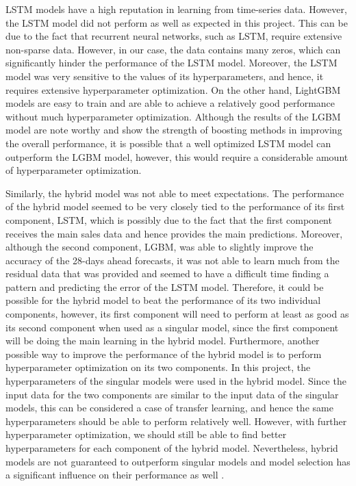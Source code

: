 LSTM models have a high reputation in learning from time-series data. 
However, the LSTM model did not perform as well as expected in this project.
This can be due to the fact that recurrent neural networks, such as LSTM, require extensive non-sparse data.
However, in our case, the data contains many zeros, which can significantly hinder the performance of the LSTM model.
Moreover, the LSTM model was very sensitive to the values of its hyperparameters, and hence, it requires extensive hyperparameter optimization.
On the other hand, LightGBM models are easy to train and are able to achieve a relatively good performance without much hyperparameter optimization.
Although the results of the LGBM model are note worthy and show the strength of boosting methods in improving the overall performance, it is possible that a well optimized LSTM model can outperform the LGBM model, however, this would require a considerable amount of hyperparameter optimization.

Similarly, the hybrid model was not able to meet expectations. 
The performance of the hybrid model seemed to be very closely tied to the performance of its first component, LSTM, which is possibly due to the fact that the first component receives the main sales data and hence provides the main predictions.
Moreover, although the second component, LGBM, was able to slightly improve the accuracy of the 28-days ahead forecasts, it was not able to learn much from the residual data that was provided and seemed to have a difficult time finding a pattern and predicting the error of the LSTM model.
Therefore, it could be possible for the hybrid model to beat the performance of its two individual components, however, its first component will need to perform at least as good as its second component when used as a singular model, since the first component will be doing the main learning in the hybrid model.
Furthermore, another possible way to improve the performance of the hybrid model is to perform hyperparameter optimization on its two components.
In this project, the hyperparameters of the singular models were used in the hybrid model.
Since the input data for the two components are similar to the input data of the singular models, this can be considered a case of transfer learning, and hence the same hyperparameters should be able to perform relatively well.
However, with further hyperparameter optimization, we should still be able to find better hyperparameters for each component of the hybrid model.
Nevertheless, hybrid models are not guaranteed to outperform singular models and model selection has a significant influence on their performance as well \cite{c12}.

